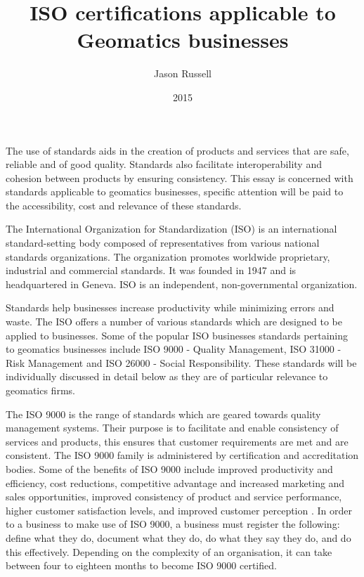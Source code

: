 \documentclass[11pt,a4paper]{article}
\title{ISO certifications applicable to Geomatics businesses}
\date{2015}
\author{Jason Russell}
\begin{document}
\maketitle

\newpage

The use of standards aids in the creation of products and services that are safe, reliable and of good quality.  Standards also facilitate interoperability and cohesion between products by ensuring consistency. This essay is concerned with standards applicable to geomatics businesses, specific attention will be paid to the accessibility, cost and relevance of these standards.

\vspace{5mm}

The International Organization for Standardization (ISO) is an international standard-setting body composed of representatives from various national standards organizations. The organization promotes worldwide proprietary, industrial and commercial standards. It was founded in 1947 and is headquartered in Geneva. ISO is an independent, non-governmental organization.

\vspace{5mm}

Standards help businesses increase productivity while minimizing errors and waste. The ISO offers a number of various standards which are designed to be applied to businesses. Some of the popular ISO businesses standards pertaining to geomatics businesses include ISO 9000 - Quality Management, ISO 31000 - Risk Management and ISO 26000 - Social Responsibility. These standards will be individually discussed in detail below as they are of particular relevance to geomatics firms.

\vspace{5mm}

The ISO 9000 is the range of standards which are geared towards quality management systems. Their purpose is to facilitate and enable consistency of services and products, this ensures that customer requirements are met and are consistent. The ISO 9000 family is administered by certification and accreditation bodies. Some of the benefits of ISO 9000 include improved productivity and efficiency, cost reductions, competitive advantage and increased marketing and sales opportunities, improved consistency of product and service performance, higher customer satisfaction levels, and improved customer perception \cite{_get_????}. In order to a business to make use of ISO 9000, a business must register the following: define what they do, document what they do, do what they say they do, and do this effectively. Depending on the complexity of an organisation, it can take between four to eighteen months to become ISO 9000 certified.
\end{document}
